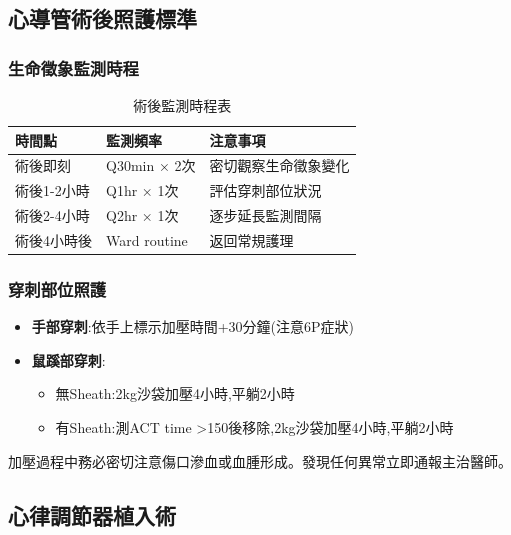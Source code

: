 \documentclass[12pt,a4paper]{article}
\newcommand{\warning}[1]{
    \par
    \noindent
    \begin{tcolorbox}[
        colback=warning_orange!5!white,
        colframe=warning_orange,
        title=\textbf{緊急通報},
        fonttitle=\bfseries,
        boxrule=1pt,
        arc=3pt,
        left=6pt,
        right=6pt,
        top=6pt,
        bottom=6pt
    ]
    #1
    \end{tcolorbox}
}
\begin{document}
\subsection{心導管術後照護標準}
\subsubsection{生命徵象監測時程}
\begin{table}[h]
    \centering
    \caption{術後監測時程表}
    \begin{tabular}{p{3cm} p{5cm} p{6cm}}
        \toprule
        \textbf{時間點} & \textbf{監測頻率} & \textbf{注意事項} \\
        \midrule
        術後即刻 & Q30min × 2次 & 密切觀察生命徵象變化 \\
        術後1-2小時 & Q1hr × 1次 & 評估穿刺部位狀況 \\
        術後2-4小時 & Q2hr × 1次 & 逐步延長監測間隔 \\
        術後4小時後 & Ward routine & 返回常規護理 \\
        \bottomrule
    \end{tabular}
\end{table}

\subsubsection{穿刺部位照護}
\begin{itemize}[nosep]
    \item \textbf{手部穿刺}:依手上標示加壓時間+30分鐘(注意6P症狀)
    \item \textbf{鼠蹊部穿刺}:
    \begin{itemize}
        \item 無Sheath:2kg沙袋加壓4小時,平躺2小時
        \item 有Sheath:測ACT time >150後移除,2kg沙袋加壓4小時,平躺2小時
    \end{itemize}
\end{itemize}

\warning{
加壓過程中務必密切注意傷口滲血或血腫形成。發現任何異常立即通報主治醫師。
}

\subsection{心律調節器植入術}
\end{document}

